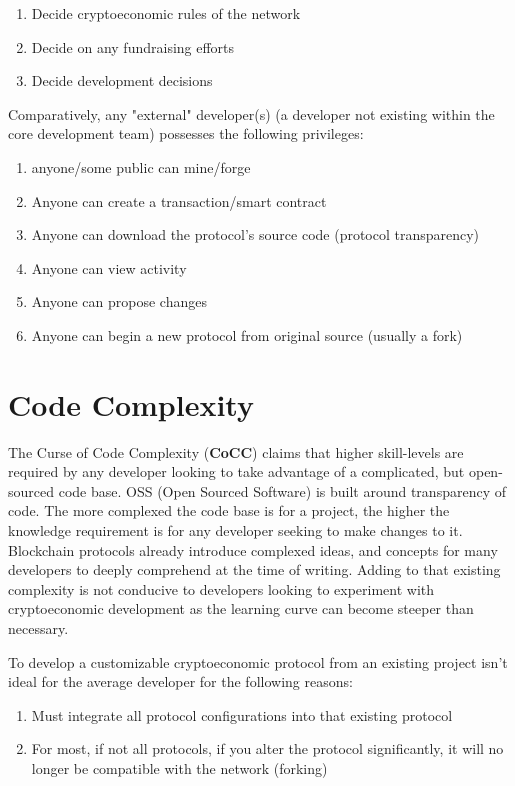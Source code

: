 \documentclass[12pt, titlepage, twocolumn]{report}
\begin{document}
\begin{enumerate}
	\item Decide cryptoeconomic rules of the network
	\item Decide on any fundraising efforts
	\item Decide development decisions
\end{enumerate}

Comparatively, any "external" developer(s) (a developer not existing within the core development team) possesses the following privileges:

\begin{enumerate}
	\item anyone/some public can mine/forge
	\item Anyone can create a transaction/smart contract
	\item Anyone can download the protocol's source code (protocol transparency)
	\item Anyone can view activity
	\item Anyone can propose changes
	\item Anyone can begin a new protocol from original source (usually a fork)
\end{enumerate}


\section{Code Complexity}

The Curse of Code Complexity (\textbf{CoCC}) claims that higher skill-levels are required by any developer looking to take advantage of a complicated, but open-sourced code base. OSS (Open Sourced Software) is built around transparency of code. The more complexed the code base is for a project, the higher the knowledge requirement is for any developer seeking to make changes to it. Blockchain protocols already introduce complexed ideas, and concepts for many developers to deeply comprehend at the time of writing. Adding to that existing complexity is not conducive to developers looking to experiment with cryptoeconomic development as the learning curve can become steeper than necessary.

To develop a customizable cryptoeconomic protocol from an existing project isn't ideal for the average developer for the following reasons:
	
\begin{enumerate}
	\item Must integrate all protocol configurations into that existing protocol
	\item For most, if not all protocols, if you alter the protocol significantly, it will no longer be compatible with the network (forking)
\end{enumerate}	
	
\end{document}
